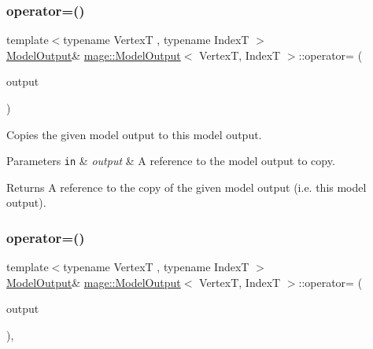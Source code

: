 \subsubsection{\texorpdfstring{operator=()}{operator=()}\hspace{0.1cm}{\footnotesize\ttfamily [1/2]}}
{\footnotesize\ttfamily template$<$typename VertexT , typename IndexT $>$ \\
\hyperlink{structmage_1_1_model_output}{Model\+Output}\& \hyperlink{structmage_1_1_model_output}{mage\+::\+Model\+Output}$<$ VertexT, IndexT $>$\+::operator= (\begin{DoxyParamCaption}\item[{const \hyperlink{structmage_1_1_model_output}{Model\+Output}$<$ VertexT, IndexT $>$ \&}]{output }\end{DoxyParamCaption})\hspace{0.3cm}{\ttfamily [delete]}}

Copies the given model output to this model output.


\begin{DoxyParams}[1]{Parameters}
\mbox{\tt in}  & {\em output} & A reference to the model output to copy. \\
\hline
\end{DoxyParams}
\begin{DoxyReturn}{Returns}
A reference to the copy of the given model output (i.\+e. this model output). 
\end{DoxyReturn}
\hypertarget{structmage_1_1_model_output_a090d74bebb6045c11952cc57fb1aa220}{}\label{structmage_1_1_model_output_a090d74bebb6045c11952cc57fb1aa220} 
\subsubsection{\texorpdfstring{operator=()}{operator=()}\hspace{0.1cm}{\footnotesize\ttfamily [2/2]}}
{\footnotesize\ttfamily template$<$typename VertexT , typename IndexT $>$ \\
\hyperlink{structmage_1_1_model_output}{Model\+Output}\& \hyperlink{structmage_1_1_model_output}{mage\+::\+Model\+Output}$<$ VertexT, IndexT $>$\+::operator= (\begin{DoxyParamCaption}\item[{\hyperlink{structmage_1_1_model_output}{Model\+Output}$<$ VertexT, IndexT $>$ \&\&}]{output }\end{DoxyParamCaption})\hspace{0.3cm}{\ttfamily [default]}, {\ttfamily [noexcept]}}

